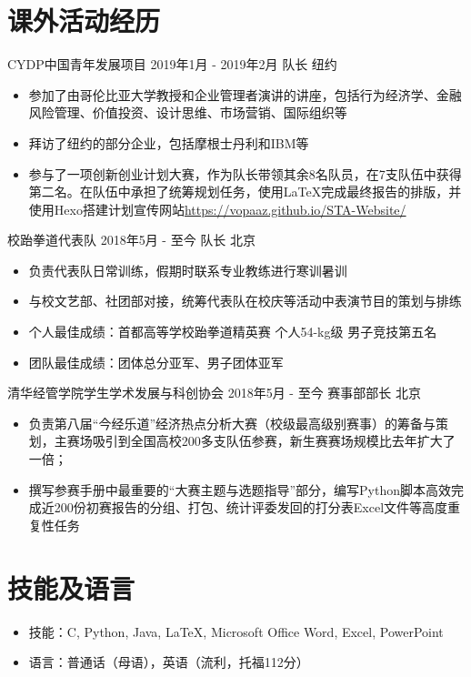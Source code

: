 \documentclass{resumeZH}
\begin{document}
    \section{课外活动经历}
    \Experience
    {CYDP中国青年发展项目}
    {2019年1月 - 2019年2月}
    {队长}
    {纽约}
    \begin{itemize}
        \item 参加了由哥伦比亚大学教授和企业管理者演讲的讲座，包括行为经济学、金融风险管理、价值投资、设计思维、市场营销、国际组织等
        \item 拜访了纽约的部分企业，包括摩根士丹利和IBM等
        \item 参与了一项创新创业计划大赛，作为队长带领其余8名队员，在7支队伍中获得第二名。在队伍中承担了统筹规划任务，使用\LaTeX 完成最终报告的排版，并使用Hexo搭建计划宣传网站\href{https://vopaaz.github.io/STA-Website/}{https://vopaaz.github.io/STA-Website/}
    \end{itemize}

    \Experience
    {校跆拳道代表队}
    {2018年5月 - 至今}
    {队长}
    {北京}

    \begin{itemize}
        \item 负责代表队日常训练，假期时联系专业教练进行寒训暑训
        \item 与校文艺部、社团部对接，统筹代表队在校庆等活动中表演节目的策划与排练
        \item 个人最佳成绩：首都高等学校跆拳道精英赛 个人54-kg级 男子竞技第五名
        \item 团队最佳成绩：团体总分亚军、男子团体亚军
    \end{itemize}

    \Experience
    {清华经管学院学生学术发展与科创协会}
    {2018年5月 - 至今}
    {赛事部部长}
    {北京}

    \begin{itemize}
        \item 负责第八届“今经乐道”经济热点分析大赛（校级最高级别赛事）的筹备与策划，主赛场吸引到全国高校200多支队伍参赛，新生赛赛场规模比去年扩大了一倍；
        \item 撰写参赛手册中最重要的“大赛主题与选题指导”部分，编写Python脚本高效完成近200份初赛报告的分组、打包、统计评委发回的打分表Excel文件等高度重复性任务
    \end{itemize}

    \section{技能及语言}
    \vspace{0.618ex}
    \begin{itemize}
        \item 技能：C, Python, Java, {\LaTeX}, Microsoft Office Word, Excel, PowerPoint
        \item 语言：普通话（母语），英语（流利，托福112分）
    \end{itemize}
\end{document}
